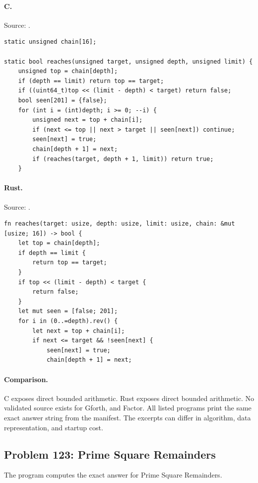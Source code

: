 \paragraph{C.} Source: .
\begin{lstlisting}
static unsigned chain[16];

static bool reaches(unsigned target, unsigned depth, unsigned limit) {
    unsigned top = chain[depth];
    if (depth == limit) return top == target;
    if ((uint64_t)top << (limit - depth) < target) return false;
    bool seen[201] = {false};
    for (int i = (int)depth; i >= 0; --i) {
        unsigned next = top + chain[i];
        if (next <= top || next > target || seen[next]) continue;
        seen[next] = true;
        chain[depth + 1] = next;
        if (reaches(target, depth + 1, limit)) return true;
    }
\end{lstlisting}

\paragraph{Rust.} Source: .
\begin{lstlisting}
fn reaches(target: usize, depth: usize, limit: usize, chain: &mut [usize; 16]) -> bool {
    let top = chain[depth];
    if depth == limit {
        return top == target;
    }
    if top << (limit - depth) < target {
        return false;
    }
    let mut seen = [false; 201];
    for i in (0..=depth).rev() {
        let next = top + chain[i];
        if next <= target && !seen[next] {
            seen[next] = true;
            chain[depth + 1] = next;
\end{lstlisting}

\paragraph{Comparison.}
C exposes direct bounded arithmetic. Rust exposes direct bounded arithmetic.
No validated source exists for Gforth, and Factor.
All listed programs print the same exact answer string from the manifest. The excerpts can differ in algorithm, data representation, and startup cost.

\subsection{Problem 123: Prime Square Remainders}
\label{walkthrough:p123}
The program computes the exact answer for Prime Square Remainders.

